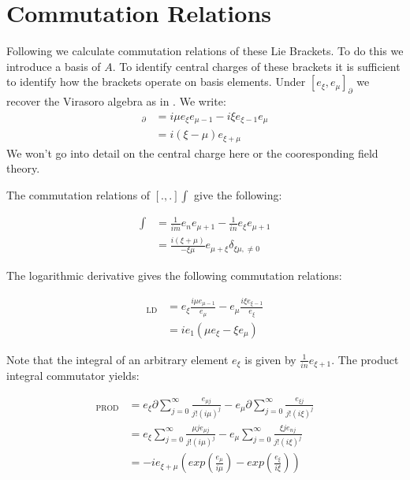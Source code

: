 \documentclass[10pt, oneside]{article}
\begin{document}
\section{Commutation Relations}
   Following \cite{teschner2017guidetwodimensionalconformalfield} \cite{Kac1990} \cite{Schottenloher1997} we calculate commutation relations of these Lie Brackets. To do this we introduce a basis of $A$. 
   To identify central charges of these brackets it is sufficient to identify how the brackets operate on basis elements. 
      Under $[e_\xi,e_\mu]_\partial$ we recover the Virasoro algebra as in \cite{teschner2017guidetwodimensionalconformalfield}. We write:
      \begin{align*}
         [e_\xi,e_\mu]_\partial &= i \mu e_\xi e_{\mu-1} - i \xi e_{\xi-1} e_\mu \\
         &= i(\xi-\mu)e_{\xi +\mu}
      \end{align*}
      We won't go into detail on the central charge here or the cooresponding field theory. 

      The commutation relations of $[.,.]\int$ give the following:

      \begin{align*}
         [e_{\xi},e_\mu]\int &= \frac{1}{i m} e_{n} e_{\mu+1} - \frac{1}{i n} e_{\xi} e_{\mu+1} \\
         &= \frac{i(\xi +\mu)}{-\xi \mu} e_{\mu+\xi} \delta_{\xi \mu,\not = 0}
      \end{align*}

      The logarithmic derivative gives the following commutation relations:

      \begin{align*}
         [e_{\xi},e_\mu]_\text{LD} &= e_{\xi} \frac{i \mu e_{\mu-1}}{e_{\mu}} - e_\mu \frac{i \xi e_{\xi-1}}{e_{\xi}} \\
         &= i e_1 (\mu e_{\xi} - \xi e_\mu)
      \end{align*}
 
      Note that the integral of an arbitrary element $e_{\xi}$ is given by $\frac{1}{in} e_{\xi+1}$. The product integral commutator yields: 
   
      \begin{align*}
         [e_{\xi}, e_\mu]_\text{PROD} &= e_{\xi} \partial \sum_{j=0}^{\infty} \frac{e_{\mu j}}{j! (i\mu)^j} - e_\mu \partial \sum_{j=0}^{\infty} \frac{e_{\xi j}}{j! (i \xi)^j} \\
         &= e_{\xi} \sum_{j=0}^\infty \frac{\mu j e_{\mu j}}{j! (i\mu)^j} - e_\mu \sum_{j=0}^\infty \frac{\xi j e_{nj}}{j! (i \xi)^j} \\
         &= -i e_{\xi+\mu} (exp(\frac{e_\mu}{i\mu}) - exp(\frac{e_{\xi}}{i\xi}))
      \end{align*}
\end{document}
